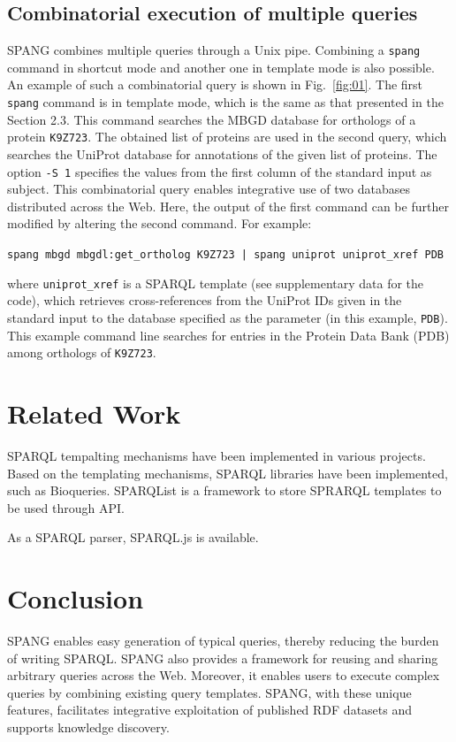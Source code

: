 \documentclass[runningheads]{llncs}
\begin{document}
\subsection{Combinatorial execution of multiple queries}

SPANG combines multiple queries through a Unix pipe. 
Combining a {\tt spang} command in shortcut mode and another one in template mode is also possible.
An example of such a combinatorial query is shown in Fig.~\ref{fig:01}.
The first {\tt spang} command is in template mode, which is the same as that presented in the Section 2.3. 
This command searches the MBGD database for orthologs of a protein {\tt K9Z723}. 
The obtained list of proteins are used in the second query, which searches the UniProt database for annotations of the given list of proteins. 
The option \texttt{-S 1} specifies the values from the first column of the standard input as subject.
This combinatorial query enables integrative use of two databases distributed across the Web. 
Here, the output of the first command can be further modified by altering the second command.
For example:
\begin{quoting}
\texttt{spang mbgd mbgdl:get\_ortholog K9Z723 | spang uniprot uniprot\_xref PDB}
\vspace{1pt}
\end{quoting}
where {\tt uniprot\_xref} is a SPARQL template (see supplementary data for the code), which retrieves cross-references from the UniProt IDs given in the standard input to the database specified as the parameter (in this example, {\tt PDB}). This example command line searches for entries in the Protein Data Bank (PDB) \citep{Berman} among orthologs of {\tt K9Z723}.



\section{Related Work}

SPARQL tempalting mechanisms have been implemented in various projects. Based on the templating mechanisms, SPARQL libraries have been implemented, such as Bioqueries. SPARQList is a framework to store SPRARQL templates to be used through API.

As a SPARQL parser, SPARQL.js is available.


\section{Conclusion}
SPANG enables easy generation of typical queries, thereby reducing the burden of writing SPARQL. SPANG also provides a framework for reusing and sharing arbitrary queries across the Web. Moreover, it enables users to execute complex queries by combining existing query templates. SPANG, with these unique features, facilitates integrative exploitation of published RDF datasets and supports knowledge discovery. 
\end{document}
